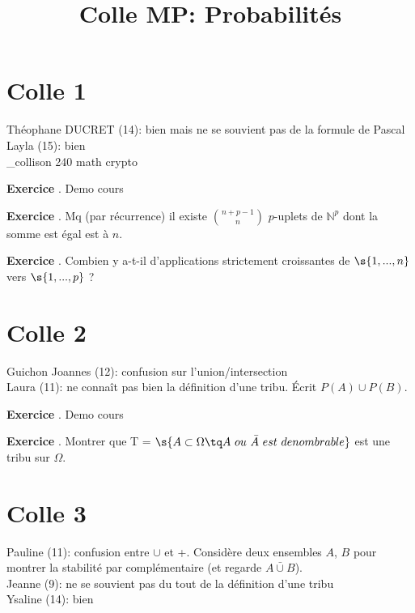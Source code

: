 \documentclass[10pt,a4paper]{article}
\title{Colle MP: Probabilités}
\newcounter{question}
\newcounter{exo}
\newenvironment{exo}{\vspace{0.5cm}\setcounter{question}{0}\addtocounter{exo}{1} \noindent \textbf{Exercice \theexo}. \normalsize }{\par}
\begin{document}
	\maketitle
	
	\section*{Colle 1}
	Théophane DUCRET (14): bien mais ne se souvient pas de la formule de Pascal\\
	Layla (15): bien\\
	
	_collison 240 math crypto
	\begin{exo}
		Demo cours
	\end{exo}

	\begin{exo}
		Mq (par récurrence) il existe $\binom{n+p-1}{n}$ $p$-uplets de $\mathbb{N}^p$ dont la somme est égal est à $n$.
	\end{exo}
	
	\begin{exo}
		Combien y a-t-il d'applications strictement croissantes de $\s{1, ..., n}$ vers $\s{1, ..., p}$ ?
	\end{exo}
	
	\section*{Colle 2}
	\setcounter{exo}{0}
	Guichon Joannes (12): confusion sur l'union/intersection\\
	Laura (11): ne connaît pas bien la définition d'une tribu. Écrit $P(A) \cup P(B)$.\\
	
	\begin{exo}
	   Demo cours
	\end{exo}

	\begin{exo}
		Montrer que T = $\s{ A \subset \Omega \tq A ~ou~ \bar{A}~ est~ denombrable}$ est une tribu sur $\Omega$.
	\end{exo}
		
	\section*{Colle 3}
	\setcounter{exo}{0}
	Pauline (11): confusion entre $\cup$ et +. Considère deux ensembles $A$, $B$ pour montrer la stabilité par complémentaire (et regarde $\bar{A \cup B}$).\\
	Jeanne (9): ne se souvient pas du tout de la définition d'une tribu\\
	Ysaline (14): bien\\
	
\end{document}

